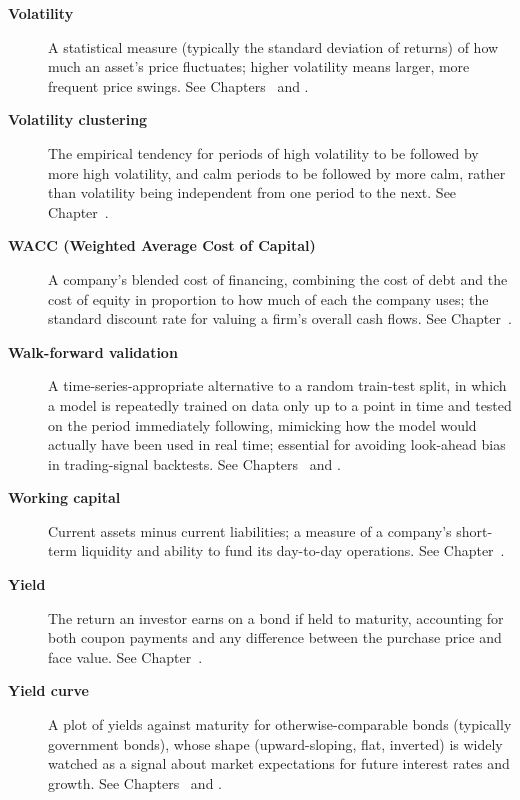 \documentclass[../ai_in_finance]{subfiles}
\begin{document}
\begin{description}
\item[\textbf{Volatility}] A statistical measure (typically the standard deviation of returns) of how much an asset's price fluctuates; higher volatility means larger, more frequent price swings. See Chapters~ and .

\item[\textbf{Volatility clustering}] The empirical tendency for periods of high volatility to be followed by more high volatility, and calm periods to be followed by more calm, rather than volatility being independent from one period to the next. See Chapter~.

\item[\textbf{WACC (Weighted Average Cost of Capital)}] A company's blended cost of financing, combining the cost of debt and the cost of equity in proportion to how much of each the company uses; the standard discount rate for valuing a firm's overall cash flows. See Chapter~.

\item[\textbf{Walk-forward validation}] A time-series-appropriate alternative to a random train-test split, in which a model is repeatedly trained on data only up to a point in time and tested on the period immediately following, mimicking how the model would actually have been used in real time; essential for avoiding look-ahead bias in trading-signal backtests. See Chapters~ and .

\item[\textbf{Working capital}] Current assets minus current liabilities; a measure of a company's short-term liquidity and ability to fund its day-to-day operations. See Chapter~.

\item[\textbf{Yield}] The return an investor earns on a bond if held to maturity, accounting for both coupon payments and any difference between the purchase price and face value. See Chapter~.

\item[\textbf{Yield curve}] A plot of yields against maturity for otherwise-comparable bonds (typically government bonds), whose shape (upward-sloping, flat, inverted) is widely watched as a signal about market expectations for future interest rates and growth. See Chapters~ and .

\end{description}
\end{document}
